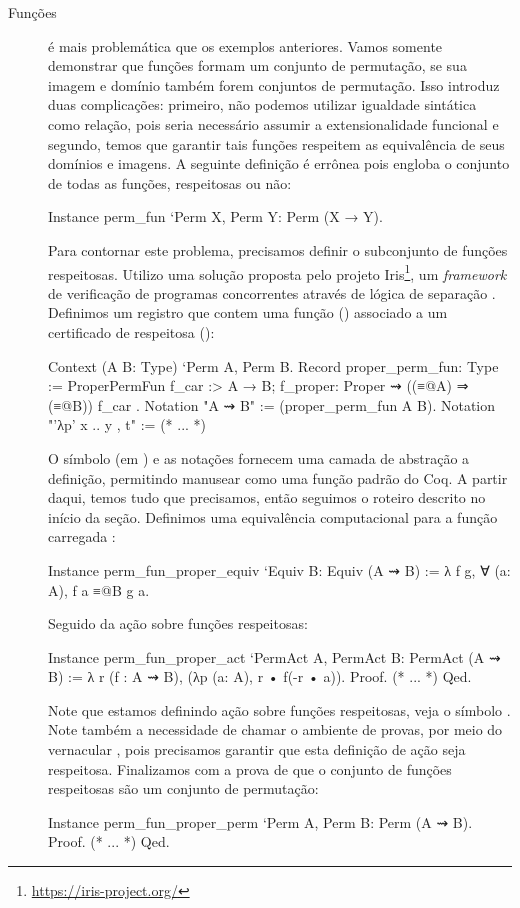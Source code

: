 \begin{description}
	\item[Funções] é mais problemática que os exemplos anteriores. Vamos somente demonstrar que funções formam um conjunto de permutação, se sua imagem e domínio também forem conjuntos de permutação. Isso introduz duas complicações: primeiro, não podemos utilizar igualdade sintática como relação, pois seria necessário assumir a extensionalidade funcional e segundo, temos que garantir tais funções respeitem as equivalência de seus domínios e imagens. A seguinte definição é errônea pois engloba o conjunto de todas as funções, respeitosas ou não:
	\begin{coqcode}
Instance perm_fun `{Perm X, Perm Y}: Perm (X → Y).
	\end{coqcode}
	Para contornar este problema, precisamos definir o subconjunto de funções respeitosas. Utilizo uma solução proposta pelo projeto Iris\footnote{\url{https://iris-project.org/}}, um \textit{framework} de verificação de programas concorrentes através de lógica de separação \cite{Jung2015,Jung2016}. Definimos um registro que contem uma função () associado a um certificado de respeitosa ():
	\begin{coqcode}
Context (A B: Type) `{Perm A, Perm B}.
Record proper_perm_fun: Type := ProperPermFun {
   f_car :> A → B;
   f_proper: Proper ⇝ ((≡@{A}) ⇒ (≡@{B})) f_car
}.
Notation "A ⇝ B" := (proper_perm_fun A B).
Notation "'λp' x .. y , t" := (* ... *)
	\end{coqcode}
	O símbolo \coqinline{:>} (em ) e as notações fornecem uma camada de abstração a definição, permitindo manusear  como uma função padrão do Coq. A partir daqui, temos tudo que precisamos, então seguimos o roteiro descrito no início da seção. Definimos uma equivalência computacional para a função carregada :
	\begin{coqcode}
Instance perm_fun_proper_equiv `{Equiv B}: Equiv (A ⇝ B) := 
   λ f g, ∀ (a: A), f a ≡@{B} g a.
	\end{coqcode}
	Seguido da ação sobre funções respeitosas:
	\begin{coqcode}
Instance perm_fun_proper_act `{PermAct A, PermAct B}: PermAct (A ⇝ B) :=
   λ r (f : A ⇝ B), (λp (a: A), r • f(-r • a)).
Proof. (* ... *) Qed.
	\end{coqcode}
	Note que estamos definindo ação sobre funções respeitosas, veja o símbolo . Note também a necessidade de chamar o ambiente de provas, por meio do vernacular , pois precisamos garantir que esta definição de ação seja respeitosa. Finalizamos com a prova de que o conjunto de funções respeitosas são um conjunto de permutação:
	\begin{coqcode}
Instance perm_fun_proper_perm `{Perm A, Perm B}: Perm (A ⇝ B).
Proof. (* ... *) Qed.
	\end{coqcode}
\end{description}
